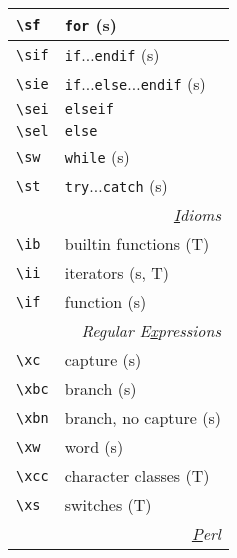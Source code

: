 \documentclass[oneside,10pt,landscape,DIV16]{scrartcl}
\begin{document}
\begin{multicols}{3}
\begin{center}
\begin{tabular}[]{|p{11mm}|p{58mm}|}
\hline \verb'\sf'     & \verb'for'                                       \hfill (s)\\
\hline \verb'\sif'    & \verb'if'$\ldots$\verb'endif'                    \hfill (s)\\
\hline \verb'\sie'    & \verb'if'$\ldots$\verb'else'$\ldots$\verb'endif' \hfill (s)\\
\hline \verb'\sei'    & \verb'elseif'                                    \\
\hline \verb'\sel'    & \verb'else'                                      \\
\hline \verb'\sw'     & \verb'while'                                     \hfill (s)\\
\hline \verb'\st'     & \verb'try'$\ldots$\verb'catch'                   \hfill (s)\\
\hline
\hline
\multicolumn{2}{|r|}{\textsl{\underline{I}dioms}}                 \\[1.0ex]
\hline \verb'\ib' & builtin functions         \hfill (T)\\
\hline \verb'\ii' & iterators                 \hfill (s, T)\\
\hline \verb'\if' & function                  \hfill (s)\\
\hline
\hline
\multicolumn{2}{|r|}{\textsl{Regular E\underline{x}pressions}}     \\[1.0ex]
\hline \verb'\xc'  & capture                 \hfill (s)\\
\hline \verb'\xbc' & branch                  \hfill (s)\\
\hline \verb'\xbn' & branch, no capture      \hfill (s)\\
\hline \verb'\xw'  & word                    \hfill (s)\\
\hline \verb'\xcc' & character classes       \hfill (T)\\
\hline \verb'\xs'  & switches                \hfill (T)\\
\hline
\hline
\multicolumn{2}{|r|}{\textsl{\underline{P}erl}}                       \\[1.0ex]

\end{tabular}
\end{center}
\end{multicols}
\end{document}
